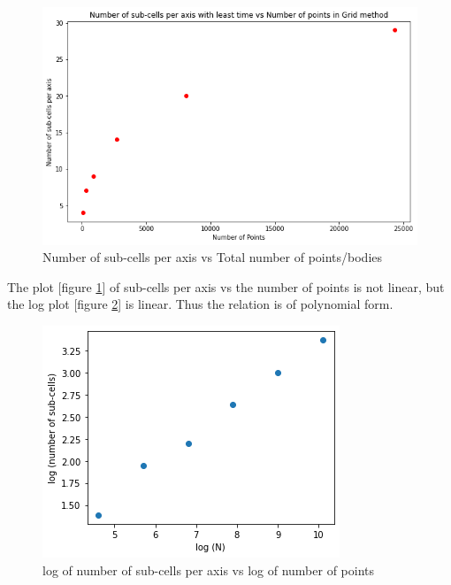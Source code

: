 \documentclass[twocolumn,11pt]{article}
\begin{document}
\begin{figure}
\centering
	\includegraphics[width=\linewidth]{subcell}
	\caption{\small{Number of sub-cells per axis vs Total number of points/bodies}}
	\label{fig10}
\end{figure}
The plot [figure \ref{fig10}] of sub-cells per axis vs the number of points is not linear, but the log plot [figure \ref{fig11}] is linear. Thus the relation is of polynomial form.
\begin{figure}[h]
\centering
	\includegraphics[width=\linewidth]{subcelllog}
	\caption{\small{log of number of sub-cells per axis vs log of number of points}}
	\label{fig11}
\end{figure}
\end{document}

